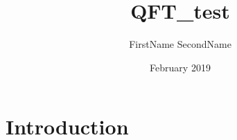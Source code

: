 \documentclass{article}
\title{QFT_test}
\author{FirstName SecondName}
\date{February 2019}
\begin{document}
\maketitle

\section{Introduction}
\end{document}
